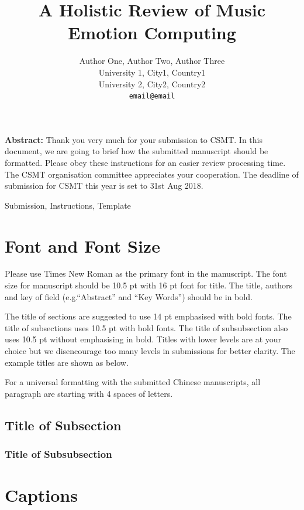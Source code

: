 \documentclass[UTF8,a4paper]{article}
\title{A Holistic Review of Music Emotion Computing}
\author{
	\textmd{\large Author One\affmark[1], Author Two\affmark[1], Author Three\affmark[1,2(\Letter)]}\\\vspace{0.27cm}
	\textmd{\affmark[1] University 1, City1, Country1}\\
	\textmd{\affmark[2] University 2, City2, Country2}\\
	\texttt{email@email}\\
}
\newenvironment{csmtAbstract}{\noindent \kaishu \small {\bfseries Abstract:}}{}
\newenvironment{keywords}{\small \noindent{\bfseries Key Words:}}{}
\begin{document}
\maketitle
\vspace{0.84cm}
\begin{csmtAbstract}
	Thank you very much for your submission to CSMT. In this document, we are going to brief how the submitted manuscript should be formatted. Please obey these instructions for an easier review processing time. The CSMT organisation committee appreciates your cooperation. The deadline of submission for CSMT this year is set to 31st Aug 2018.
\end{csmtAbstract}

\begin{keywords}
	Submission, Instructions, Template
\end{keywords}

\section{Font and Font Size}

Please use Times New Roman as the primary font in the manuscript. The font size for manuscript should be 10.5 pt with 16 pt font for title. The title, authors and key of field (e.g.``Abstract'' and ``Key Words'') should be in bold.

The title of sections are suggested to use 14 pt emphasised with bold fonts. The title of subsections uses 10.5 pt with bold fonts. The title of subsubsection also uses 10.5 pt without emphasising in bold. Titles with lower levels are at your choice but we disencourage too many levels in submissions for better clarity. The example titles are shown as below.

For a universal formatting with the submitted Chinese manuscripts, all paragraph are starting with 4 spaces of letters.

\subsection{Title of Subsection}
\subsubsection{Title of Subsubsection}

\section{Captions}
\end{document}
